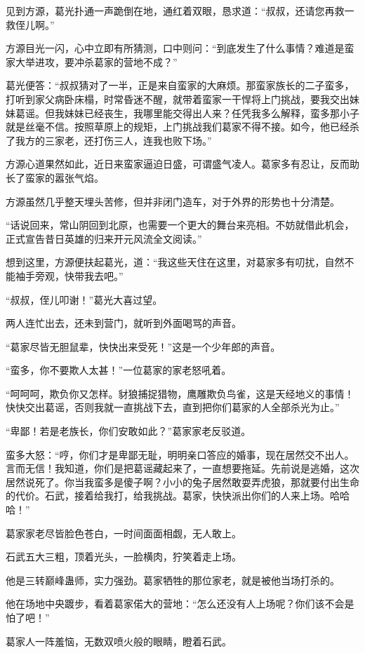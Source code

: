 \begin{this_body}
见到方源，葛光扑通一声跪倒在地，通红着双眼，恳求道：“叔叔，还请您再救一救侄儿啊。”

方源目光一闪，心中立即有所猜测，口中则问：“到底发生了什么事情？难道是蛮家大举进攻，要冲杀葛家的营地不成？”

葛光便答：“叔叔猜对了一半，正是来自蛮家的大麻烦。那蛮家族长的二子蛮多，打听到家父病卧床榻，时常昏迷不醒，就带着蛮家一干悍将上门挑战，要我交出妹妹葛谣。但我妹妹已经丧生，我哪里能交得出人来？任凭我多么解释，蛮多那小子就是丝毫不信。按照草原上的规矩，上门挑战我们葛家不得不接。如今，他已经杀了我方的三家老，还打伤三人，连我也败下场。”

方源心道果然如此，近日来蛮家逼迫日盛，可谓盛气凌人。葛家多有忍让，反而助长了蛮家的嚣张气焰。

方源虽然几乎整天埋头苦修，但并非闭门造车，对于外界的形势也十分清楚。

“话说回来，常山阴回到北原，也需要一个更大的舞台来亮相。不妨就借此机会，正式宣告昔日英雄的归来开元风流全文阅读。”

想到这里，方源便扶起葛光，道：“我这些天住在这里，对葛家多有叨扰，自然不能袖手旁观，快带我去吧。”

“叔叔，侄儿叩谢！”葛光大喜过望。

两人连忙出去，还未到营门，就听到外面喝骂的声音。

“葛家尽皆无胆鼠辈，快快出来受死！”这是一个少年郎的声音。

“蛮多，你不要欺人太甚！”一位葛家的家老怒吼着。

“呵呵呵，欺负你又怎样。豺狼捕捉猎物，鹰雕欺负鸟雀，这是天经地义的事情！快快交出葛谣，否则我就一直挑战下去，直到把你们葛家的人全部杀光为止。”

“卑鄙！若是老族长，你们安敢如此？”葛家家老反驳道。

蛮多大怒：“哼，你们才是卑鄙无耻，明明亲口答应的婚事，现在居然交不出人。言而无信！我知道，你们是把葛谣藏起来了，一直想要拖延。先前说是逃婚，这次居然说死了。你当我蛮多是傻子啊？小小的兔子居然敢耍弄虎狼，那就要付出生命的代价。石武，接着给我打，给我挑战。葛家，快快派出你们的人来上场。哈哈哈！”

葛家家老尽皆脸色苍白，一时间面面相觑，无人敢上。

石武五大三粗，顶着光头，一脸横肉，狞笑着走上场。

他是三转巅峰蛊师，实力强劲。葛家牺牲的那位家老，就是被他当场打杀的。

他在场地中央踱步，看着葛家偌大的营地：“怎么还没有人上场呢？你们该不会是怕了吧！”

葛家人一阵羞恼，无数双喷火般的眼睛，瞪着石武。


\end{this_body}
